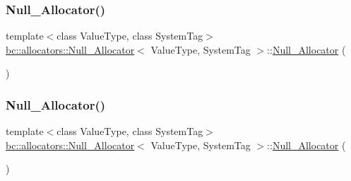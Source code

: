 \subsubsection{\texorpdfstring{Null\+\_\+\+Allocator()}{Null\_Allocator()}\hspace{0.1cm}{\footnotesize\ttfamily [2/4]}}
{\footnotesize\ttfamily template$<$class Value\+Type, class System\+Tag$>$ \\
\hyperlink{structbc_1_1allocators_1_1Null__Allocator}{bc\+::allocators\+::\+Null\+\_\+\+Allocator}$<$ Value\+Type, System\+Tag $>$\+::\hyperlink{structbc_1_1allocators_1_1Null__Allocator}{Null\+\_\+\+Allocator} (\begin{DoxyParamCaption}\item[{const \hyperlink{structbc_1_1allocators_1_1Null__Allocator}{Null\+\_\+\+Allocator}$<$ Value\+Type, System\+Tag $>$ \&}]{ }\end{DoxyParamCaption})\hspace{0.3cm}{\ttfamily [default]}}

\mbox{\label{structbc_1_1allocators_1_1Null__Allocator_a9e023aa05e3b2737cff40658bac42a34}} 
\subsubsection{\texorpdfstring{Null\+\_\+\+Allocator()}{Null\_Allocator()}\hspace{0.1cm}{\footnotesize\ttfamily [3/4]}}
{\footnotesize\ttfamily template$<$class Value\+Type, class System\+Tag$>$ \\
\hyperlink{structbc_1_1allocators_1_1Null__Allocator}{bc\+::allocators\+::\+Null\+\_\+\+Allocator}$<$ Value\+Type, System\+Tag $>$\+::\hyperlink{structbc_1_1allocators_1_1Null__Allocator}{Null\+\_\+\+Allocator} (\begin{DoxyParamCaption}\item[{\hyperlink{structbc_1_1allocators_1_1Null__Allocator}{Null\+\_\+\+Allocator}$<$ Value\+Type, System\+Tag $>$ \&\&}]{ }\end{DoxyParamCaption})\hspace{0.3cm}{\ttfamily [default]}}

\mbox{\label{structbc_1_1allocators_1_1Null__Allocator_a88355ca3599adc8fa3379b8ebe3eba0d}} 
